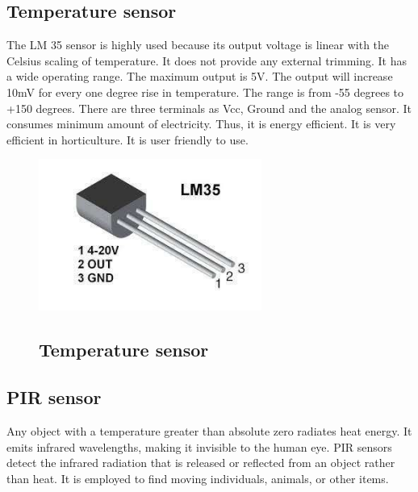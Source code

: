 \documentclass{wsdcr}
\begin{document}
\subsection{Temperature sensor}
The LM 35 sensor is highly used because its output voltage 
is linear with the Celsius scaling of temperature. It does not 
provide any external trimming. It has a wide operating 
range. The maximum output is 5V. The output will increase 
10mV for every one degree rise in temperature. The range is 
from -55 degrees to +150 degrees. There are three terminals 
as Vcc, Ground and the analog sensor. It consumes 
minimum amount of electricity. Thus, it is energy efficient. 
It is very efficient in horticulture. It is user friendly to use. 
\begin{figure}[t!]
    \centering
    \includegraphics[width=.9\linewidth]{temp.png}
    \caption{ }
\subsection{ Temperature sensor }
    \label{fig:example}
\end{figure}
\subsection{PIR sensor}
Any object with a temperature greater than absolute zero radiates heat energy. It emits infrared wavelengths, making it invisible to the human eye. PIR sensors detect the infrared radiation that is released or reflected from an object rather than heat. It is employed to find moving individuals, animals, or other items.
\end{document}
